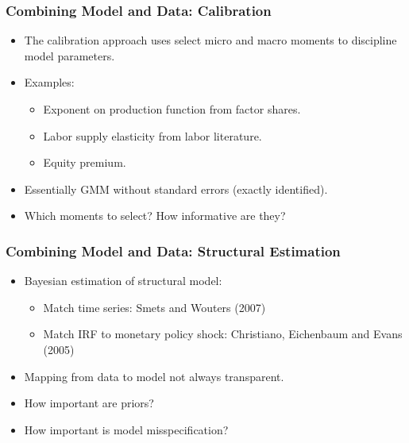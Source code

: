 \documentclass[english,xcolor=svgnames]{beamer}
\begin{document}
\begin{frame}
\frametitle[alignment=center]{Combining Model and Data: Calibration}
\begin{itemize}
	\item The calibration approach uses select micro and macro moments to discipline model parameters.
	\item Examples:
	\begin{itemize}
		\item Exponent on production function from factor shares.
		\item Labor supply elasticity from labor literature.
		\item Equity premium.
	\end{itemize}
	\item Essentially GMM without standard errors (exactly identified).
	\item Which moments to select? How informative are they?
\end{itemize}
\end{frame}


\begin{frame}
\frametitle[alignment=center]{Combining Model and Data: Structural Estimation}
\begin{itemize}
	\item Bayesian estimation of structural model:
	\begin{itemize}
		\item Match time series: Smets and Wouters (2007)
		\item Match IRF to monetary policy shock: Christiano, Eichenbaum and Evans (2005)
	\end{itemize}
	\item Mapping from data to model not always transparent.
	\item How important are priors?
	\item How important is model misspecification?
\end{itemize}
\end{frame}
\end{document}

